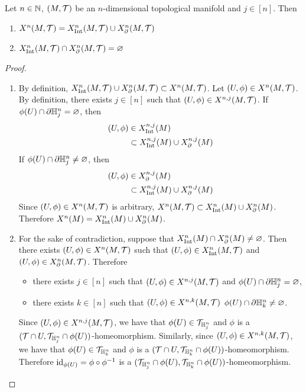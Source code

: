 \documentclass{book}
\begin{document}
	\begin{ex} 
		Let $n \in \mathbb{N}$, $(M, \mathcal{T})$ be an $n$-dimensional topological manifold and $j \in [n]$. Then 
		\begin{enumerate}
			\item $X^n(M, \mathcal{T}) = X^n_{\operatorname{Int}}(M, \mathcal{T}) \cup X^n_{\partial}(M, \mathcal{T})$
			\item $X^n_{\operatorname{Int}}(M, \mathcal{T}) \cap X^n_{\partial}(M, \mathcal{T}) = \varnothing$
		\end{enumerate}
	\end{ex}

	\begin{proof}\ 
		\begin{enumerate}
			\item By definition, $X^n_{\operatorname{Int}}(M, \mathcal{T}) \cup X^n_{\partial}(M, \mathcal{T}) \subset X^n(M, \mathcal{T})$. Let $(U, \phi) \in X^n(M, \mathcal{T})$. By definition, there exists $j \in [n]$ such that $(U, \phi) \in X^{n,j}(M, \mathcal{T})$. If $\phi(U) \cap \partial \mathbb{H}^n_j = \varnothing$, then 
			\begin{align*}
				(U, \phi) 
				& \in X^{n,j}_{\operatorname{Int}}(M) \\
				& \subset X^{n,j}_{\operatorname{Int}}(M) \cup X^{n,j}_{\partial}(M)
			\end{align*}
			If $\phi(U) \cap \partial \mathbb{H}^n_j \neq \varnothing$, then 
			\begin{align*}
				(U, \phi) 
				& \in X^{n,j}_{\partial}(M) \\
				& \subset X^{n,j}_{\operatorname{Int}}(M) \cup X^{n,j}_{\partial}(M)
			\end{align*}
			Since $(U, \phi) \in X^n(M, \mathcal{T})$ is arbitrary, $X^n(M, \mathcal{T}) \subset X^n_{\operatorname{Int}}(M) \cup X^n_{\partial}(M)$. Therefore $X^n(M) = X^n_{\operatorname{Int}}(M) \cup X^n_{\partial}(M)$.
			\item For the sake of contradiction, suppose that $X^n_{\operatorname{Int}}(M) \cap X^n_{\partial}(M) \neq \varnothing$. Then there exists $(U, \phi) \in X^n(M, \mathcal{T})$ such that $(U, \phi) \in X^n_{\operatorname{Int}}(M, \mathcal{T})$ and $(U, \phi) \in X^n_{\partial}(M, \mathcal{T})$. Therefore 
			\begin{itemize}
				\item there exists $j \in [n]$ such that $(U, \phi) \in X^{n,j}(M, \mathcal{T})$ and $\phi(U) \cap \partial \mathbb{H}^n_j = \varnothing$,
				\item there exists $k \in [n]$ such that $(U, \phi) \in X^{n,k}(M, \mathcal{T})$ $\phi(U) \cap \partial \mathbb{H}^n_k \neq \varnothing$.
			\end{itemize}
			Since $(U, \phi) \in X^{n,j}(M, \mathcal{T})$, we have that $\phi(U) \in \mathcal{T}_{\mathbb{H}^n_j}$ and $\phi$ is a $(\mathcal{T} \cap U, \mathcal{T}_{\mathbb{H}^n_j} \cap \phi(U))$-homeomorphism. Similarly, since $(U, \phi) \in X^{n,k}(M, \mathcal{T})$, we have that $\phi(U) \in \mathcal{T}_{\mathbb{H}^n_k}$ and $\phi$ is a $(\mathcal{T} \cap U, \mathcal{T}_{\mathbb{H}^n_k} \cap \phi(U))$-homeomorphism. Therefore $\operatorname{id}_{\phi(U)} = \phi \circ \phi^{-1}$ is a $(\mathcal{T}_{\mathbb{H}^n_j} \cap \phi(U), \mathcal{T}_{\mathbb{H}^n_k} \cap \phi(U))$-homeomorphism. 
			

\end{enumerate}
\end{proof}
\end{document}
